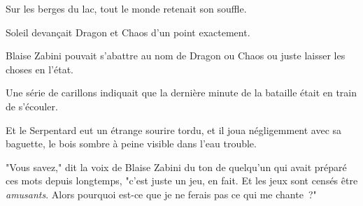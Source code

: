 Sur les berges du lac, tout le monde retenait son souffle.

Soleil devançait Dragon et Chaos d'un point exactement.

Blaise Zabini pouvait s'abattre au nom de Dragon ou Chaos ou juste laisser les choses en l'état.

Une série de carillons indiquait que la dernière minute de la bataille était en train de s'écouler.

Et le Serpentard eut un étrange sourire tordu, et il joua négligemment avec sa baguette, le bois sombre à peine visible dans l'eau trouble.

"Vous savez," dit la voix de Blaise Zabini du ton de quelqu'un qui avait préparé ces mots depuis longtemps, "c'est juste un jeu, en fait. Et les jeux sont censés être \emph{amusants}. Alors pourquoi est-ce que je ne ferais pas ce qui me chante~?"~ 

